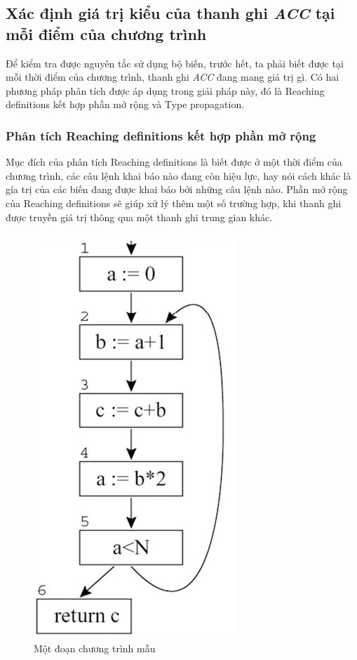 \subsection{Xác định giá trị kiểu của thanh ghi \textit{ACC} tại mỗi điểm của chương trình}
Để kiểm tra được nguyên tắc sử dụng bộ biến, trước hết, ta phải biết được tại mỗi thời điểm của chương trình, thanh ghi \textit{ACC} đang mang giá trị gì. Có hai phương pháp phân tích được áp dụng trong giải pháp này, đó là Reaching definitions kết hợp phần mở rộng và Type propagation.
\subsubsection{Phân tích Reaching definitions kết hợp phần mở rộng}
Mục đích của phân tích Reaching definitions là biết được ở một thời điểm của chương trình, các câu lệnh khai báo nào đang còn hiệu lực, hay nói cách khác là gía trị của các biến đang được khai báo bởi những câu lệnh nào. Phần mở rộng của Reaching definitions sẽ giúp xử lý thêm một số trường hợp, khi thanh ghi được truyền giá trị thông qua một thanh ghi trung gian khác.
\begin{figure}
	\centering
	\includegraphics[scale=0.75]{image/reachingDefExam}
	\caption{Một đoạn chương trình mẫu}
	\label{fig:reachingdefexam}
\end{figure}
